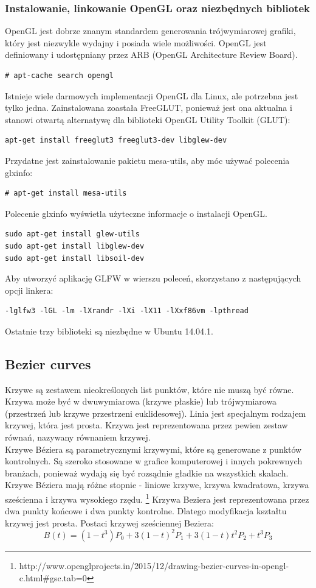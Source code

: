 \documentclass[paper=a4, fontsize=11pt]{scrartcl} %
\begin{document}
\subsubsection{Instalowanie, linkowanie OpenGL oraz niezbędnych bibliotek}
OpenGL jest dobrze znanym standardem generowania trójwymiarowej grafiki, który jest niezwykle wydajny i posiada wiele możliwości. OpenGL jest definiowany i udostępniany przez ARB (OpenGL Architecture Review Board).
\begin{verbatim}
# apt-cache search opengl
\end{verbatim}
Istnieje wiele darmowych implementacji OpenGL dla Linux, ale potrzebna jest tylko jedna. Zainstalowana zoastała FreeGLUT, ponieważ jest ona aktualna i stanowi otwartą alternatywę dla biblioteki OpenGL Utility Toolkit (GLUT):
\begin{verbatim}
apt-get install freeglut3 freeglut3-dev libglew-dev
\end{verbatim}
Przydatne jest zainstalowanie pakietu mesa-utils, aby móc używać polecenia glxinfo:
\begin{verbatim}
# apt-get install mesa-utils
\end{verbatim}
Polecenie glxinfo wyświetla użyteczne informacje o instalacji OpenGL.
\begin{verbatim}
sudo apt-get install glew-utils
sudo apt-get install libglew-dev
sudo apt-get install libsoil-dev
\end{verbatim}
Aby utworzyć aplikację GLFW w wierszu poleceń, skorzystano z następujących opcji linkera:
\begin{verbatim}
-lglfw3 -lGL -lm -lXrandr -lXi -lX11 -lXxf86vm -lpthread
\end{verbatim}
Ostatnie trzy biblioteki są niezbędne w Ubuntu 14.04.1.

\subsection{Bezier curves}
Krzywe są zestawem nieokreślonych list punktów, które nie muszą być równe. Krzywa może być w dwuwymiarowa (krzywe płaskie) lub trójwymiarowa (przestrzeń lub krzywe przestrzeni euklidesowej). Linia jest specjalnym rodzajem krzywej, która jest prosta. Krzywa jest reprezentowana przez pewien zestaw równań, nazywany równaniem krzywej.\\
Krzywe Béziera są parametrycznymi krzywymi, które są generowane z punktów kontrolnych. Są szeroko stosowane w grafice komputerowej i innych pokrewnych branżach, ponieważ wydają się być rozsądnie gładkie na wszystkich skalach. Krzywe Béziera mają różne stopnie - liniowe krzywe, krzywa kwadratowa, krzywa sześcienna i krzywa wysokiego rzędu. \footnote{http://www.openglprojects.in/2015/12/drawing-bezier-curves-in-opengl-c.html\#gsc.tab=0}
Krzywa Beziera jest reprezentowana przez dwa punkty końcowe i dwa punkty kontrolne. Dlatego modyfikacja kształtu krzywej jest prosta. Postaci krzywej sześciennej Beziera:
\begin{equation}
B(t)=(1-t^{3})P_{0}+3(1-t)^{2}P_{1}+3(1-t)t^{2}P_{2}+t^{3}P_{3} 
\end{equation}
\end{document}
